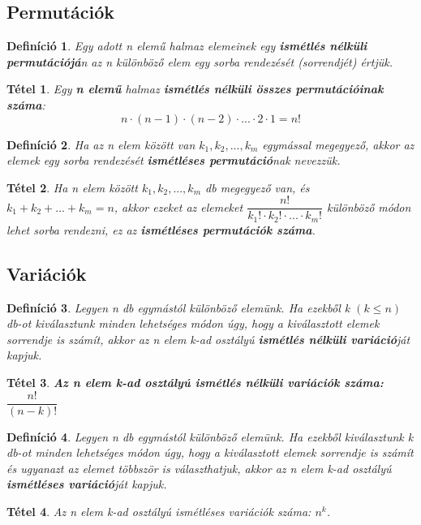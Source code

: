 \documentclass[12pt,a4paper]{article}
\newtheorem{theorem}{Tétel} [section]
\newtheorem{definition}{Definíció} [section]
\begin{document}
\subsection{Permutációk}
\begin{definition}
Egy adott n elemű halmaz elemeinek egy \textbf{ismétlés nélküli permutációjá}n az n különböző elem egy sorba rendezését (sorrendjét) értjük.
\end{definition}
\begin{theorem}
Egy \textbf{n elemű} halmaz \textbf{ismétlés nélküli összes permutációinak száma}:
\[n\cdot (n-1)\cdot (n-2)\cdot ... \cdot 2\cdot 1=n!\]
\end{theorem}
\begin{definition}
Ha az n elem között van $k_1, k_2, ..., k_m$ egymással megegyező, akkor az elemek egy sorba rendezését \textbf{ismétléses permutáció}nak nevezzük.
\end{definition}
\begin{theorem}
Ha n elem között $k_1, k_2, ..., k_m$ db megegyező van, és $k_1+ k_2+ ...+ k_m=n$, akkor ezeket az elemeket $\dfrac{n!}{k_1!\cdot k_2!\cdot ...\cdot k_m!}$ különböző módon lehet sorba rendezni, ez az \textbf{ismétléses permutációk száma}.
\end{theorem}

\subsection{Variációk}
\begin{definition}
Legyen n db egymástól különböző elemünk. Ha ezekből k $(k \leq n)$ db-ot kiválasztunk minden lehetséges módon úgy, hogy a kiválasztott elemek sorrendje is számít, akkor az n elem k-ad osztályú \textbf{ismétlés nélküli variáció}ját kapjuk.
\end{definition}
\begin{theorem}
\textbf{Az n elem k-ad osztályú ismétlés nélküli variációk száma:} $\dfrac{n!}{(n-k)!}$
\end{theorem}

\begin{definition}
Legyen n db egymástól különböző elemünk. Ha ezekből kiválasztunk k db-ot minden lehetséges módon úgy, hogy a kiválasztott elemek sorrendje is számít és ugyanazt az elemet többször is választhatjuk, akkor az n elem k-ad osztályú \textbf{ismétléses variáció}ját kapjuk.
\end{definition}
\begin{theorem}
Az n elem k-ad osztályú ismétléses variációk száma: $n^k$.
\end{theorem}
\end{document}
